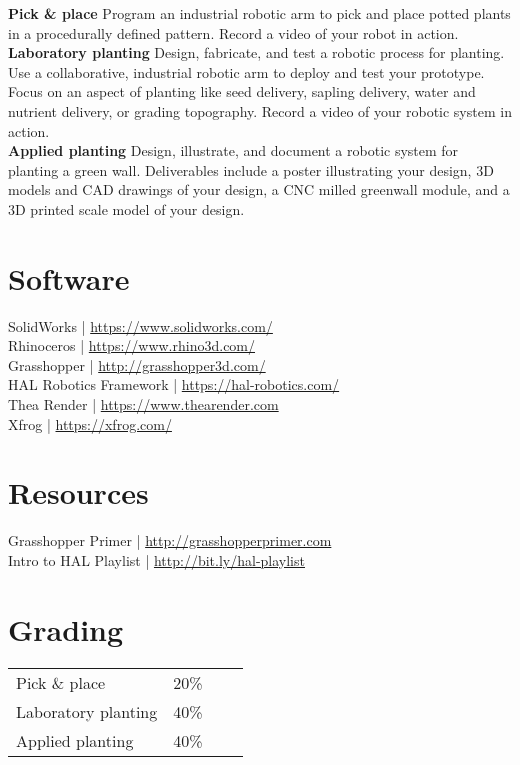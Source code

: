 \documentclass[11pt,article,oneside]{memoir}
\begin{document}
\noindent \textbf{Pick \& place}
Program an industrial robotic arm to pick and place
potted plants in a procedurally defined pattern.
Record a video of your robot in action.
\\

\noindent \textbf{Laboratory planting}
Design, fabricate, and test a robotic process for planting.
Use a collaborative, industrial robotic arm to
deploy and test your prototype.
Focus on an aspect of planting like 
seed delivery, sapling delivery,
water and nutrient delivery, or
grading topography. 
Record a video of your robotic system in action.
\\

\noindent \textbf{Applied planting}
Design, illustrate, and document
a robotic system for planting a green wall.
Deliverables include 
a poster illustrating your design,
3D models and CAD drawings of your design, 
a CNC milled greenwall module,
and a 3D printed scale model of your design.
\\

\section{Software}
SolidWorks | \url{https://www.solidworks.com/}\\
Rhinoceros | \url{https://www.rhino3d.com/}\\
Grasshopper | \url{http://grasshopper3d.com/}\\
HAL Robotics Framework | \url{https://hal-robotics.com/}\\
Thea Render | \url{https://www.thearender.com}\\
Xfrog | \url{https://xfrog.com/}

\section{Resources}
Grasshopper Primer | \url{http://grasshopperprimer.com}\\
Intro to HAL Playlist | \url{http://bit.ly/hal-playlist}

\section{Grading}
%
\begin{table}[H]
\begin{tabular}{l r @{\hskip 2cm} l @{\hskip 0.5cm} l}
%
Pick \& place & 20\% \\
Laboratory planting & 40\%  \\
Applied planting & 40\% \\
%
\end{tabular}
\end{table}
\end{document}
